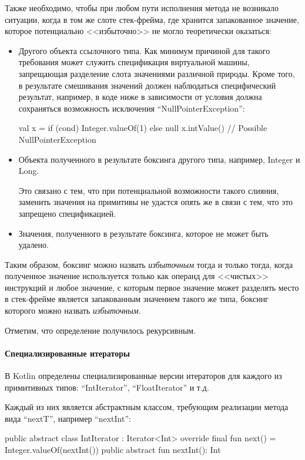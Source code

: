 Также необходимо, чтобы при любом пути исполнения метода не возникало ситуации, когда в том же
слоте стек-фрейма, где хранится запакованное значение, которое потенциально <<избыточно>>
не могло теоретически оказаться:
\begin{itemize}
    \item Другого объекта ссылочного типа. Как минимум причиной для такого требования может служить
    спецификация виртуальной машины, запрещающая разделение слота значениями различной природы.
    Кроме того, в результате смешивания значений должен наблюдаться специфический результат,
    например, в коде ниже в зависимости от условия должна сохраняться возможность исключения
    ``NullPointerException'':
    \begin{pyglist}[language=kotlin]
        val x = if (cond) Integer.valueOf(1) else null
        x.intValue() // Possible NullPointerException
    \end{pyglist}

    \item Объекта полученного в результате боксинга другого типа, например, Integer и Long.

    Это связано с тем, что при потенциальной возможности такого слияния, заменить значения на
    примитивы не удастся опять же в связи с тем, что это запрещено спецификацией.

    \item Значения, полученного в результате боксинга, которое не может быть удалено.
\end{itemize}

Таким образом, боксинг можно назвать \textit{избыточным} тогда и только тогда, когда полученное
значение используется только как операнд для <<чистых>> инструкций и любое значение, с которым
первое значение может разделять место в стек-фрейме является запакованным значением такого же
типа, боксинг которого можно назвать \textit{избыточным}.

Отметим, что определение получилось рекурсивным.

\paragraph{Специализированные итераторы}
В Kotlin определены специализированные версии итераторов для каждого из примитивных типов:
``IntIterator'', ``FloatIterator'' и т.д.

Каждый из них является абстрактным классом, требующим реализации метода вида ``nextT'', например
``nextInt'':
\begin{pyglist}[language=kotlin]
    public abstract class IntIterator : Iterator<Int> {
        override final fun next() = Integer.valueOf(nextInt())
        public abstract fun nextInt(): Int
    }
\end{pyglist}

